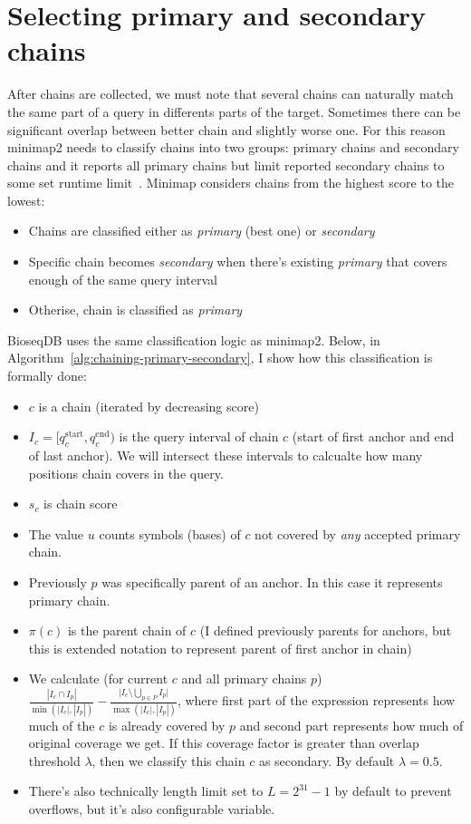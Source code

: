 \clearpage
\section{Selecting primary and secondary chains}
\label{sec:chaining-primary-secondary}

After chains are collected, we must note that several chains can naturally match the same part of a query in differents parts of the target.
Sometimes there can be significant overlap between better chain and slightly worse one. For this reason minimap2 needs to classify chains 
into two groups: primary chains and secondary chains and it reports all primary chains but limit reported secondary chains to some set runtime limit~\autocite{mmseqs2_issue_323}.
Minimap considers chains from the highest score to the lowest:
\begin{itemize}
  \item Chains are classified either as \emph{primary} (best one) or \emph{secondary}
  \item Specific chain becomes \emph{secondary} when there's existing \emph{primary} that covers enough of the same query interval 
  \item Otherise, chain is classified as \emph{primary}
\end{itemize}
BioseqDB uses the same classification logic as minimap2. Below, in Algorithm~\ref{alg:chaining-primary-secondary}, I show how this classification is formally done:
\begin{itemize}
  \item $c$ is a chain (iterated by decreasing score)
  \item \(I_c=[q_c^{\mathrm{start}},q_c^{\mathrm{end}})\) is the query interval of chain $c$ (start of first anchor and end of last anchor).
  We will intersect these intervals to calcualte how many positions chain covers in the query.
  \item \(s_c\) is chain score
  \item The value \(u\) counts symbols (bases) of $c$ not covered by \emph{any} accepted primary chain.
  \item Previously $p$ was specifically parent of an anchor. In this case it represents primary chain.
  \item $\pi(c)$ is the parent chain of $c$ (I defined previously parents for anchors, but this is extended notation to represent parent of first anchor in chain)
  \item We calculate (for current $c$ and all primary chains $p$) $\frac{|I_c\cap I_p|}{\min(|I_c|,|I_p|)}-\frac{\bigl|I_c\setminus\bigcup_{p\in P}I_p\bigr|}{\max(|I_c|,|I_p|)}$, where first part of the expression represents how 
  much of the $c$ is already covered by $p$ and second part represents how much of original coverage we get. If this coverage factor is greater than overlap threshold $\lambda$, then we classify this chain $c$ as secondary.
  By default \(\lambda=0.5\).
  \item There's also technically length limit set to \(L=2^{31}-1\) by default to prevent overflows, but it's also configurable variable.
\end{itemize}

